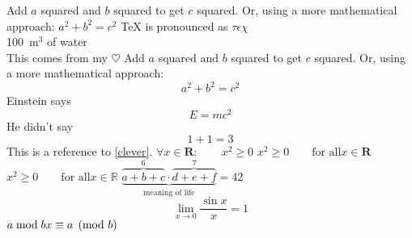\documentclass{article}
\begin{document}
Add $a$ squared and $b$ squared to get $c$ squared. Or, using a more mathematical approach:
$a^2 + b^2 = c^2$
\newline
\TeX{} is pronounced as $\tau\epsilon\chi$\\[5pt]
100~m$^{3}$ of water\\[5pt]
This comes from my $\heartsuit$
\newline
Add $a$ squared and $b$ squared to get $c$ squared. Or, using a more mathematical approach:
\begin{equation}
a^2 + b^2 = c^2
\end{equation}
Einstein says
\begin{equation}
E = mc^2 \label{clever}
\end{equation}
He didn't say
\begin{equation}
1 + 1 = 3 \tag{dumb}
\end{equation}
This is a reference to \eqref{clever}.
\newline
$\forall x \in \mathbf{R}:
 \qquad x^{2} \geq 0$
\newline
$x^{2} \geq 0\qquad
 \text{for all}x\in\mathbf{R}$
\newline
$x^{2} \geq 0\qquad
 \text{for all}x\in\mathbb{R}$
$\underbrace{\overbrace{a+b+c}^6\cdot\overbrace{d+e+f}^7}_\text{meaning of life} = 42$
\begin{equation*}
 \lim_{x \rightarrow 0}
 \frac{\sin x}{x}=1
\end{equation*}
$a\bmod b \\
 x\equiv a \pmod{b}$
\end{document}
